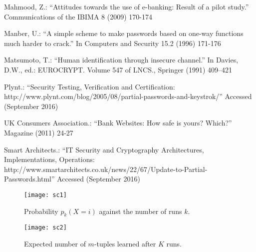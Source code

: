\documentclass{llncs}
\begin{document}
\begin{thebibliography}{1}
 Mahmood, Z.: ``Attitudes towards the use of e-banking: Result of a pilot study.''
 Communications of the IBIMA 8 (2009) 170-174

Manber, U.: ``A simple scheme to make passwords based on one-way
functions much harder to crack.''
In Computers and Security 15.2 (1996) 171-176

Matsumoto, T.: ``Human identification through insecure channel.''
In Davies, D.W., ed.: EUROCRYPT. Volume 547 of LNCS., Springer (1991) 409–421






Plynt.: ``Security Testing, Verification and Certification: http://www.plynt.com/blog/2005/08/partial-passwords-and-keystrok/'' 
Accessed (September 2016)


UK Consumers Association.: ``Bank Websites: How safe is yours? Which?''
Magazine (2011) 24-27

Smart Architects.: ``IT Security and Cryptography Architectures, Implementations, Operations: http://www.smartarchitects.co.uk/news/22/67/Update-to-Partial-Passwords.html'' 
Accessed (September 2016)

\end{thebibliography}


\begin{figure}[!htbp]
\centering
\texttt{[image: sc1]}\caption{Probability $p_k(X=i)$ against the number of runs $k$.}
\end{figure}

\begin{figure}[!htbp]
\centering
\texttt{[image: sc2]}\caption{Expected number of $m$-tuples learned after $K$ runs.}
\end{figure}
\end{document}
